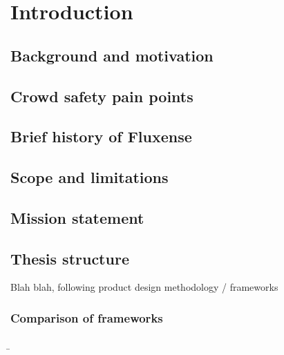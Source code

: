 \chapter{Introduction}

\section{Background and motivation}

\section{Crowd safety pain points}

\section{Brief history of Fluxense}

\section{Scope and limitations}

\section{Mission statement}

\section{Thesis structure}

Blah blah, following product design methodology / frameworks

\subsection{Comparison of frameworks}

\b{}




